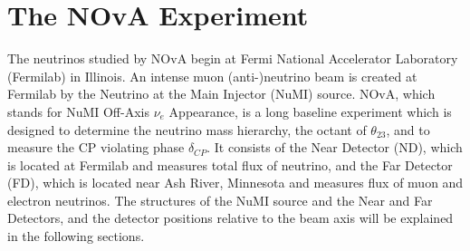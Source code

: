 \chapter{The NOvA Experiment}
\label{experiment_chapter}

The neutrinos studied by NOvA begin at Fermi National Accelerator Laboratory (Fermilab) 
in Illinois. An intense muon (anti-)neutrino beam is created at Fermilab by the Neutrino 
at the Main Injector (NuMI) source. NOvA, which stands for NuMI Off-Axis $\nu_e$ Appearance, 
is a long baseline experiment which is designed to determine the neutrino mass hierarchy, 
the octant of $\theta_{23}$, and to measure the CP violating phase $\delta_{CP}$. It 
consists of the Near Detector (ND), which is located at Fermilab and measures total flux of 
neutrino, and the Far Detector (FD), which is located near Ash River, Minnesota and measures 
flux of muon and electron neutrinos. The structures of the NuMI source and the Near and 
Far Detectors, and the detector positions relative to the beam axis will be explained in 
the following sections.

